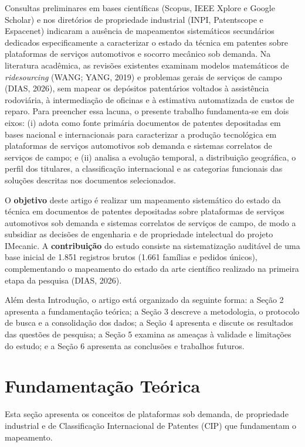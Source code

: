 \documentclass[12pt,a4paper]{article}
\begin{document}
Consultas preliminares em bases científicas (Scopus, IEEE Xplore e Google Scholar) e nos diretórios de propriedade industrial (INPI, Patentscope e Espacenet) indicaram a ausência de mapeamentos sistemáticos secundários dedicados especificamente a caracterizar o estado da técnica em patentes sobre plataformas de serviços automotivos e socorro mecânico sob demanda. Na literatura acadêmica, as revisões existentes examinam modelos matemáticos de \textit{ridesourcing} (WANG; YANG, 2019) e problemas gerais de serviços de campo (DIAS, 2026), sem mapear os depósitos patentários voltados à assistência rodoviária, à intermediação de oficinas e à estimativa automatizada de custos de reparo. Para preencher essa lacuna, o presente trabalho fundamenta-se em dois eixos: (i) adota como fonte primária documentos de patentes depositadas em bases nacional e internacionais para caracterizar a produção tecnológica em plataformas de serviços automotivos sob demanda e sistemas correlatos de serviços de campo; e (ii) analisa a evolução temporal, a distribuição geográfica, o perfil dos titulares, a classificação internacional e as categorias funcionais das soluções descritas nos documentos selecionados.

O \textbf{objetivo} deste artigo é realizar um mapeamento sistemático do estado da técnica em documentos de patentes depositadas sobre plataformas de serviços automotivos sob demanda e sistemas correlatos de serviços de campo, de modo a subsidiar as decisões de engenharia e de propriedade intelectual do projeto IMecanic. A \textbf{contribuição} do estudo consiste na sistematização auditável de uma base inicial de 1.851 registros brutos (1.661 famílias e pedidos únicos), complementando o mapeamento do estado da arte científico realizado na primeira etapa da pesquisa (DIAS, 2026).

Além desta Introdução, o artigo está organizado da seguinte forma: a Seção 2 apresenta a fundamentação teórica; a Seção 3 descreve a metodologia, o protocolo de busca e a consolidação dos dados; a Seção 4 apresenta e discute os resultados das questões de pesquisa; a Seção 5 examina as ameaças à validade e limitações do estudo; e a Seção 6 apresenta as conclusões e trabalhos futuros.

\section{Fundamentação Teórica}

Esta seção apresenta os conceitos de plataformas sob demanda, de propriedade industrial e de Classificação Internacional de Patentes (CIP) que fundamentam o mapeamento.
\end{document}
